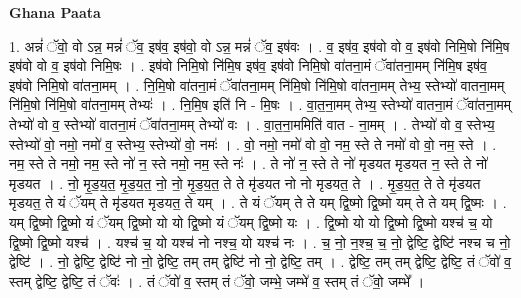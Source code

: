 \documentclass[17pt]{extarticle}
\begin{document}
\textbf{Ghana Paata } \newline

1. अन्नं॑ ॅवो॒ वो ऽन्न॒ मन्नं॑ ॅव॒ इष॑व॒ इष॑वो॒ वो ऽन्न॒ मन्नं॑ ॅव॒ इष॑वः । . व॒ इष॑व॒ इष॑वो वो व॒ इष॑वो निमि॒षो नि॑मि॒ष इष॑वो वो व॒ इष॑वो निमि॒षः । . इष॑वो निमि॒षो नि॑मि॒ष इष॑व॒ इष॑वो निमि॒षो वा॑तना॒मं ॅवा॑तना॒मम् नि॑मि॒ष इष॑व॒ इष॑वो निमि॒षो वा॑तना॒मम् । . नि॒मि॒षो वा॑तना॒मं ॅवा॑तना॒मम् नि॑मि॒षो नि॑मि॒षो वा॑तना॒मम् तेभ्य॒ स्तेभ्यो॑ वातना॒मम् नि॑मि॒षो नि॑मि॒षो वा॑तना॒मम् तेभ्यः॑ । . नि॒मि॒ष इति॑ नि - मि॒षः । . वा॒त॒ना॒मम् तेभ्य॒ स्तेभ्यो॑ वातना॒मं ॅवा॑तना॒मम् तेभ्यो॑ वो व॒ स्तेभ्यो॑ वातना॒मं ॅवा॑तना॒मम् तेभ्यो॑ वः । . वा॒त॒ना॒ममिति॑ वात - ना॒मम् । . तेभ्यो॑ वो व॒ स्तेभ्य॒ स्तेभ्यो॑ वो॒ नमो॒ नमो॑ व॒ स्तेभ्य॒ स्तेभ्यो॑ वो॒ नमः॑ । . वो॒ नमो॒ नमो॑ वो वो॒ नम॒ स्ते ते नमो॑ वो वो॒ नम॒ स्ते । . नम॒ स्ते ते नमो॒ नम॒ स्ते नो॑ न॒ स्ते नमो॒ नम॒ स्ते नः॑ । . ते नो॑ न॒ स्ते ते नो॑ मृडयत मृडयत न॒ स्ते ते नो॑ मृडयत । . नो॒ मृ॒ड॒य॒त॒ मृ॒ड॒य॒त॒ नो॒ नो॒ मृ॒ड॒य॒त॒ ते ते मृ॑डयत नो नो मृडयत॒ ते । . मृ॒ड॒य॒त॒ ते ते मृ॑डयत मृडयत॒ ते यं ॅयम् ते मृ॑डयत मृडयत॒ ते यम् । . ते यं ॅयम् ते ते यम् द्वि॒ष्मो द्वि॒ष्मो यम् ते ते यम् द्वि॒ष्मः । . यम् द्वि॒ष्मो द्वि॒ष्मो यं ॅयम् द्वि॒ष्मो यो यो द्वि॒ष्मो यं ॅयम् द्वि॒ष्मो यः । . द्वि॒ष्मो यो यो द्वि॒ष्मो द्वि॒ष्मो यश्च॑ च॒ यो द्वि॒ष्मो द्वि॒ष्मो यश्च॑ । . यश्च॑ च॒ यो यश्च॑ नो नश्च॒ यो यश्च॑ नः । . च॒ नो॒ न॒श्च॒ च॒ नो॒ द्वेष्टि॒ द्वेष्टि॑ नश्च च नो॒ द्वेष्टि॑ । . नो॒ द्वेष्टि॒ द्वेष्टि॑ नो नो॒ द्वेष्टि॒ तम् तम् द्वेष्टि॑ नो नो॒ द्वेष्टि॒ तम् । . द्वेष्टि॒ तम् तम् द्वेष्टि॒ द्वेष्टि॒ तं ॅवो॑ व॒ स्तम् द्वेष्टि॒ द्वेष्टि॒ तं ॅवः॑ । . तं ॅवो॑ व॒ स्तम् तं ॅवो॒ जम्भे॒ जम्भे॑ व॒ स्तम् तं ॅवो॒ जम्भे᳚ । \newline
\end{document}
